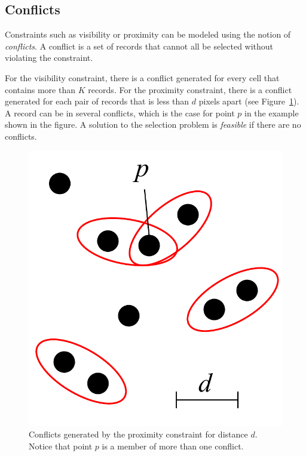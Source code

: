 \documentclass[11pt, oneside]{report}
\begin{document}
{\subsection{Conflicts}
\label{sec:cvl:conflicts}

Constraints such as visibility or proximity can be modeled using the notion of \emph{conflicts}. A conflict is a set of records that cannot all be selected without violating the constraint.

For the visibility constraint, there is a conflict generated for every cell that contains more than $K$ records. For the proximity constraint, there is a conflict generated for each pair of records that is less than $d$ pixels apart (see Figure~\ref{fig:cvl:proximity:conflict}). A record can be in several conflicts, which is the case for point $p$ in the example shown in the figure. A solution to the selection problem is \emph{feasible} if there are no conflicts.

\begin{figure}[htbp]
\begin{center}
\includegraphics[scale=.3]{figs-cvl/cvl_proximity_conflicts.pdf}
\caption{Conflicts generated by the proximity constraint for distance $d$. Notice that point $p$ is a member of more than one conflict.}
\label{fig:cvl:proximity:conflict}
\end{center}
\vspace*{-4ex}
\end{figure}

}
\end{document}
